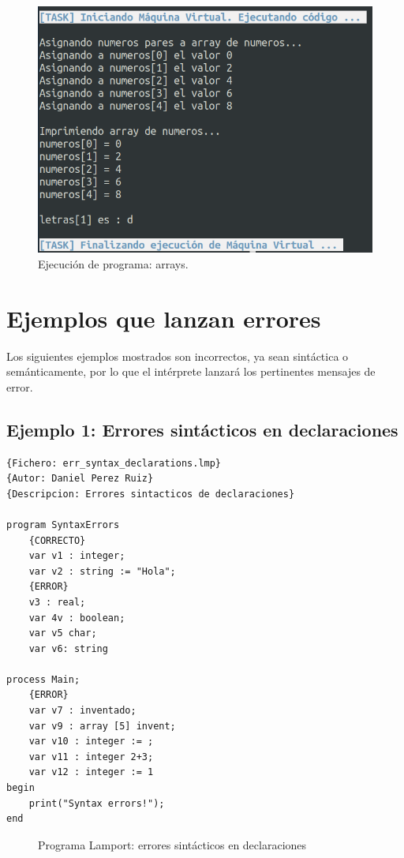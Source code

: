 \newpage
\begin{figure}[h]
    \includegraphics[width=\linewidth]{images/ejemplos/array.png}
    \caption{Ejecución de programa: arrays.}
    \label{fig:lamportArray_exec}
\end{figure}

\newpage
\section{Ejemplos que lanzan errores}
Los siguientes ejemplos mostrados son incorrectos, ya sean sintáctica o semánticamente, por lo que el intérprete lanzará los pertinentes mensajes de error.

\subsection{Ejemplo 1: Errores sintácticos en declaraciones}
\begin{lstlisting}[style=lamportStyle]
{Fichero: err_syntax_declarations.lmp}
{Autor: Daniel Perez Ruiz}
{Descripcion: Errores sintacticos de declaraciones}

program SyntaxErrors
	{CORRECTO}
	var v1 : integer;
	var v2 : string := "Hola";
	{ERROR}
	v3 : real;
	var 4v : boolean;
	var v5 char;
	var v6: string

process Main;
	{ERROR}
	var v7 : inventado;
	var v9 : array [5] invent;
	var v10 : integer := ;
	var v11 : integer 2+3;
	var v12 : integer := 1
begin
	print("Syntax errors!");
end
\end{lstlisting}
\begin{figure}[h]
\caption{Programa Lamport: errores sintácticos en declaraciones}
\label{fig:lamportErrSintaxDecl}
\end{figure}

